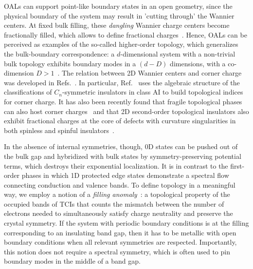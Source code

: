 OALs can support point-like boundary states in an open geometry, since the physical boundary of the system may result in 'cutting through' the Wannier centers. At fixed bulk filling, these \emph{dangling} Wannier charge centers become fractionally filled, which allows to define fractional charges~\cite{miertOrtixFractionalCharge17,miertcorners,EzawaWannier19,benalcazar2018quantization,GDY22019,GDY12019}. Hence, OALs can be perceived as examples of the so-called higher-order topology, which generalizes the bulk-boundary correspondence: a $d$-dimensional system with a non-trivial bulk topology exhibits boundary modes in a $(d-D)$ dimensions, with a co-dimension $D > 1$~\cite{BABHughesBenalcazar17,PhysRevLett.119.246401,HOTI12018,Benalcazar17, Song17,Khalaf18,Geier18,BenMoTe2}. The relation between 2D Wannier centers and corner charge was developed in Refs.~\cite{Song17,miertcorners,benalcazar2018quantization}. In particular, Ref.~\cite{benalcazar2018quantization} uses the algebraic structure of the classifications of $C_n$-symmetric insulators in class AI to build topological indices for corner charge. It has also been recently found that fragile topological phases can also host corner charges~\cite{benalcazar2018quantization,wieder2018axion} and that 2D second-order topological insulators also exhibit fractional charges at the core of defects with curvature singularities in both spinless and spinful insulators~\cite{benalcazar2018quantization,PhysRevX.9.031003,li2019fractional}.

In the absence of internal symmetries, though, $\mathrm{0D}$ states can be pushed out of the bulk gap and hybridized with bulk states by symmetry-preserving potential terms, which destroys their exponential localization. It is in contrast to the first-order phases in which 1D protected edge states demonstrate a spectral flow connecting conduction and valence bands. To define topology in a meaningful way, we employ a notion of a \emph{filling anomaly}~\cite{benalcazar2018quantization}: a topological property of the occupied bands of TCIs that counts the mismatch between the number of electrons needed to simultaneously satisfy charge neutrality and preserve the crystal symmetry. If the system with periodic boundary conditions is at the filling corresponding to an insulating band gap, then it has to be metallic with open boundary conditions when all relevant symmetries are respected. Importantly, this notion does not require a spectral symmetry, which is often used to pin boundary modes in the middle of a band gap. 

